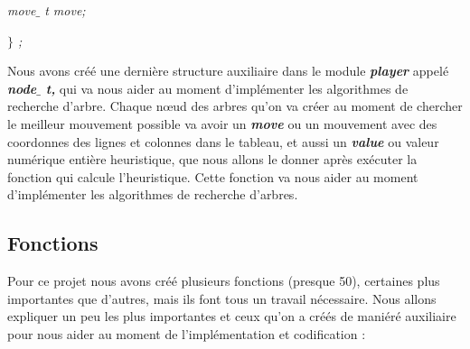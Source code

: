 \documentclass[a4paper,12pt]{article}
\begin{document}
\noindent \begin{justify}
\hspace*{0.49in}\hspace*{0.49in}\hspace*{0.49in}\hspace*{0.49in}\hspace*{0.49in}\textit{move$ \_ $ t move;}
\end{justify}\par


\noindent \begin{justify}
\hspace*{0.49in}\hspace*{0.49in}\hspace*{0.49in}\hspace*{0.49in}\textit{$ \} $ ;}
\end{justify}\par


\noindent \begin{justify}
Nous avons créé une dernière structure auxiliaire dans le module \textbf{\textit{player}} appelé \textbf{\textit{node$ \_ $ t, }}qui va nous aider au moment d’implémenter les algorithmes de recherche d’arbre. Chaque nœud des arbres qu’on va créer au moment de chercher le meilleur mouvement possible va avoir un \textbf{\textit{move}} ou un mouvement avec des coordonnes des lignes et colonnes dans le tableau, et aussi un \textbf{\textit{value }}ou valeur numérique entière heuristique, que nous allons le donner après exécuter la fonction qui calcule l’heuristique. Cette fonction va nous aider au moment d’implémenter les algorithmes de recherche d’arbres. 
\end{justify}\par


\vspace{\baselineskip}

\noindent \subsection{Fonctions}\par


\noindent \begin{justify}
Pour ce projet nous avons créé plusieurs fonctions (presque 50), certaines plus importantes que d’autres, mais ils font tous un travail nécessaire. Nous allons expliquer un peu les plus importantes et ceux qu’on a créés de maniéré auxiliaire pour nous aider au moment de l’implémentation et codification :
\end{justify}\par
\end{document}

